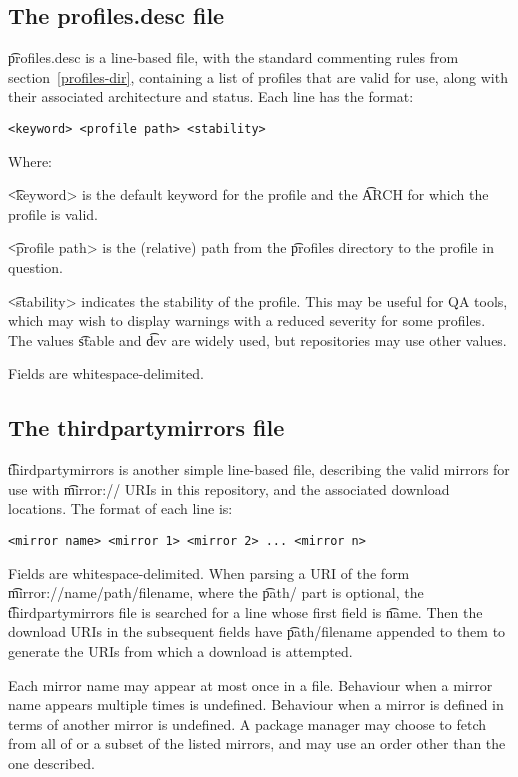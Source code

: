 \subsection{The profiles.desc file}
\label{profiles.desc}
\t{profiles.desc} is a line-based file, with the standard commenting
rules from section~\ref{profiles-dir}, containing a list of profiles
that are valid for use, along with their associated architecture and
status. Each line has the format:

\begin{verbatim}
<keyword> <profile path> <stability>
\end{verbatim}

Where:

\begin{compactitem}
\item \t{<keyword>} is the default keyword for the profile and the \t{ARCH} for which the profile is
    valid.
\item \t{<profile path>} is the (relative) path from the \t{profiles} directory to the profile in
    question.
\item \t{<stability>} indicates the stability of the profile. This may be useful for QA tools, which
    may wish to display warnings with a reduced severity for some profiles. The values \t{stable}
    and \t{dev} are widely used, but repositories may use other values.
\end{compactitem}

Fields are whitespace-delimited.

\subsection{The thirdpartymirrors file}
\label{thirdpartymirrors}
\t{thirdpartymirrors} is another simple line-based file, describing the valid mirrors for use with
\t{mirror://} URIs in this repository, and the associated download locations. The format of each
line is:
\begin{verbatim}
<mirror name> <mirror 1> <mirror 2> ... <mirror n>
\end{verbatim}
Fields are whitespace-delimited. When parsing a URI of the form \t{mirror://name/path/filename},
where the \t{path/} part is optional, the \t{thirdpartymirrors} file is searched for a line whose
first field is \t{name}. Then the download URIs in the subsequent fields have \t{path/filename}
appended to them to generate the URIs from which a download is attempted.

Each mirror name may appear at most once in a file. Behaviour when a mirror name appears multiple
times is undefined. Behaviour when a mirror is defined in terms of another mirror is undefined. A
package manager may choose to fetch from all of or a subset of the listed mirrors, and may use an
order other than the one described.

